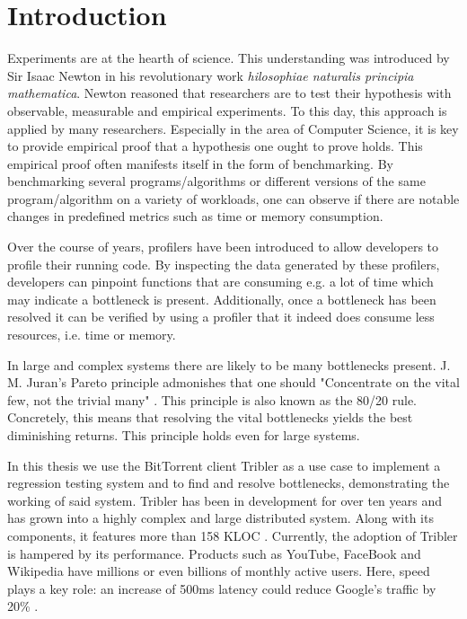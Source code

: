 \chapter{Introduction}
\label{chp:introduction}

Experiments are at the hearth of science.
This understanding was introduced by Sir Isaac Newton in his revolutionary work \emph{hilosophiae naturalis principia mathematica}.
Newton reasoned that researchers are to test their hypothesis with observable, measurable and empirical experiments.
To this day, this approach is applied by many researchers.
Especially in the area of Computer Science, it is key to provide empirical proof that a hypothesis one ought to prove holds.
This empirical proof often manifests itself in the form of benchmarking.
By benchmarking several programs/algorithms or different versions of the same program/algorithm on a variety of workloads, one can observe if there are notable changes in predefined metrics such as time or memory consumption.

Over the course of years, profilers have been introduced to allow developers to profile their running code.
By inspecting the data generated by these profilers, developers can pinpoint functions that are consuming e.g. a lot of time which may indicate a bottleneck is present.
Additionally, once a bottleneck has been resolved it can be verified by using a profiler that it indeed does consume less resources, i.e. time or memory.

In large and complex systems there are likely to be many bottlenecks present.
J. M. Juran's Pareto principle admonishes that one should "Concentrate on the vital few, not the trivial many" \cite{ammons2004finding}. This principle is also known as the 80/20 rule.
Concretely, this means that resolving the vital bottlenecks yields the best diminishing returns.
This principle holds even for large systems.

In this thesis we use the BitTorrent client Tribler as a use case to implement a regression testing system and to find and resolve bottlenecks, demonstrating the working of said system.
Tribler has been in development for over ten years and has grown into a highly complex and large distributed system.
Along with its components, it features more than 158 KLOC \cite{tribler2015about}.
Currently, the adoption of Tribler is hampered by its performance. 
Products such as YouTube, FaceBook and Wikipedia have millions or even billions of monthly active users.
Here, speed plays a key role: an increase of 500ms latency could reduce Google's traffic by 20\% \cite{mayer2009search}.

